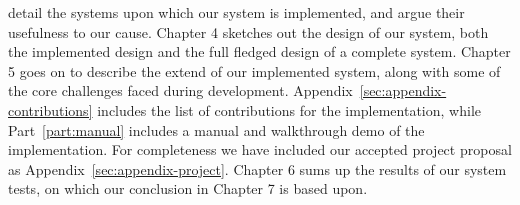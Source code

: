 detail the systems upon which our system is implemented, and argue their
usefulness to our cause. Chapter 4 sketches out the design of our system, both 
the implemented design and the full fledged design of a complete system.
Chapter 5 goes on to describe the extend of our implemented system, along with
some of the core challenges faced during development.
Appendix~\ref{sec:appendix-contributions} includes the list of contributions for the implementation, while Part~\ref{part:manual} includes a manual and walkthrough demo of the implementation. For
completeness we have included our accepted project proposal as Appendix~\ref{sec:appendix-project}.
Chapter 6 sums up the results of our system tests, on which our conclusion in
Chapter 7 is based upon.

